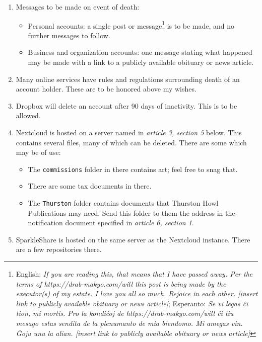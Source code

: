 \begin{enumerate}
\def\labelenumi{\arabic{enumi}.}
\tightlist
\item
  Messages to be made on event of death:

  \begin{itemize}
  \tightlist
  \item
    Personal accounts: a single post or message\footnote{English: \emph{If you are reading this, that means that I have passed away. Per the terms of https://drab-makyo.com/will this post is being made by the executor(s) of my estate. I love you all so much. Rejoice in each other. {[}insert link to publicly available obituary or news article{]}}; Esperanto: \emph{Se vi legas ĉi tion, mi mortis. Pro la kondiĉoj de https://drab-makyo.com/will ĉi tiu mesago estas sendita de la plenumanto de mia biendomo. Mi amegas vin. Ĝoju unu la alian. {[}insert link to publicly available obituary or news article{]}}} is to be made, and no further messages to follow.
  \item
    Business and organization accounts: one message stating what happened may be made with a link to a publicly available obituary or news article.
  \end{itemize}
\item
  Many online services have rules and regulations surrounding death of an account holder. These are to be honored above my wishes.
\item
  Dropbox will delete an account after 90 days of inactivity. This is to be allowed.
\item
  Nextcloud is hosted on a server named in \emph{article 3, section 5} below. This contains several files, many of which can be deleted. There are some which may be of use:

  \begin{itemize}
  \tightlist
  \item
    The \texttt{commissions} folder in there contains art; feel free to snag that.
  \item
    There are some tax documents in there.
  \item
    The \texttt{Thurston} folder contains documents that Thurston Howl Publications may need. Send this folder to them the address in the notification document specified in \emph{article 6, section 1}.
  \end{itemize}
\item
  SparkleShare is hosted on the same server as the Nextcloud instance. There are a few repositories there.


\end{enumerate}
